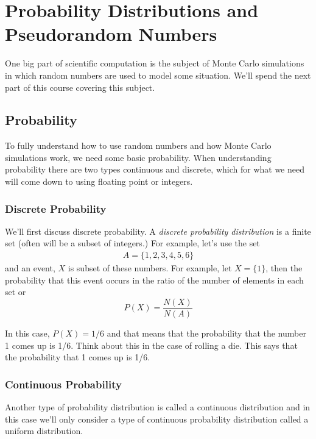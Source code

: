 
\chapter{Probability Distributions and Pseudorandom Numbers}
\label{ch:random}

One big part of scientific computation is the subject of Monte Carlo
simulations in which random numbers are used to model some situation.
We'll spend the next part of this course covering this subject.


\section{Probability}\label{probability}

To fully understand how to use random numbers and how Monte Carlo
simulations work, we need some basic probability. When understanding
probability there are two types continuous and discrete, which for what
we need will come down to using floating point or integers.

\subsection{Discrete Probability}

We'll first discuss discrete probability. A \emph{discrete probability
distribution} is a finite set (often will be a subset of integers.) For
example, let's use the set
\begin{align*}
A=\{1,2,3,4,5,6\}
\end{align*}
%
and an event, $X$ is subset of these numbers. For example, let
$X=\{1\}$, then the probability that this event occurs in the ratio of
the number of elements in each set or \[P(X)=\frac{N(X)}{N(A)}\]

In this case, $P(X)=1/6$ and that means that the probability that the
number 1 comes up is 1/6. Think about this in the case of rolling a die.
This says that the probability that 1 comes up is 1/6.

\subsection{Continuous Probability}

Another type of probability distribution is called a continuous
distribution and in this case we'll only consider a type of continuous
probability distribution called a uniform distribution.

